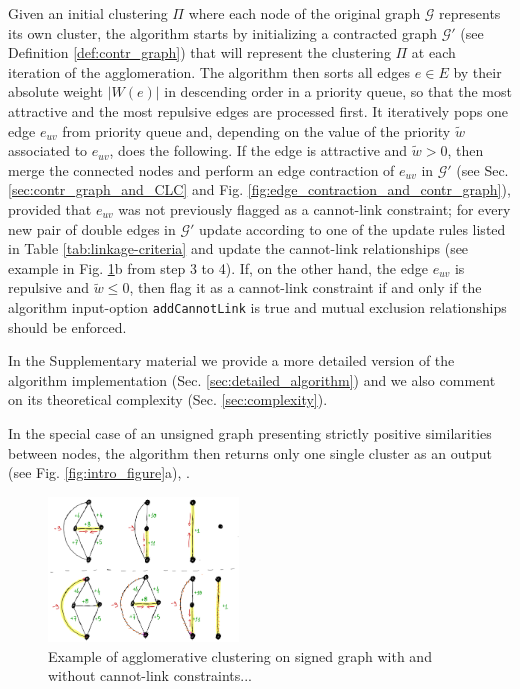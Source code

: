 Given an initial clustering $\Pi$ where each node of the original graph $\mathcal{G}$ represents its own cluster, the algorithm starts by initializing a contracted graph $\mathcal{G}'$ (see Definition \ref{def:contr_graph}) that will represent the clustering $\Pi$ at each iteration of the agglomeration. The algorithm then sorts all edges $e\in E$ by their absolute weight $|W(e)|$ in descending order in a priority queue, so that the most attractive and the most repulsive edges are processed first. It iteratively pops one edge $e_{uv}$ from priority queue and, depending on the value of the priority $\tilde{w}$ associated to $e_{uv}$, does the following. If the edge is attractive and $\tilde{w}>0$, then merge the connected nodes and perform an edge contraction of $e_{uv}$ in $\mathcal{G}'$ (see Sec. \ref{sec:contr_graph_and_CLC} and Fig. \ref{fig:edge_contraction_and_contr_graph}), provided that $e_{uv}$ was not previously flagged as a cannot-link constraint; for every new pair of double edges in $\mathcal{G}'$ update  according to one of the update rules listed in Table \ref{tab:linkage-criteria} and update the cannot-link relationships (see example in Fig. \ref{fig:algorithm_with_without_CLC}b from step 3 to 4). If, on the other hand, the edge $e_{uv}$ is repulsive and $\tilde{w}\leq 0$, then flag it as a cannot-link constraint if and only if the algorithm input-option \texttt{addCannotLink} is true and mutual exclusion relationships should be enforced.

In the Supplementary material we provide a more detailed version of the algorithm implementation (Sec. \ref{sec:detailed_algorithm}) and we also comment on its theoretical complexity (Sec. \ref{sec:complexity}).

 In the special case of an unsigned graph %
 presenting strictly positive similarities between nodes, the algorithm then returns only one single cluster as an output (see Fig. \ref{fig:intro_figure}a),  .




\begin{figure}
\centering
\includegraphics[width=0.45\textwidth,trim=0.in 0.in 0.in 0.in,clip]{./figs/cannot-lin-constraints.png}
\caption{\small 
Example of agglomerative clustering on signed graph with and without cannot-link constraints...
\label{fig:algorithm_with_without_CLC}}
\end{figure}

